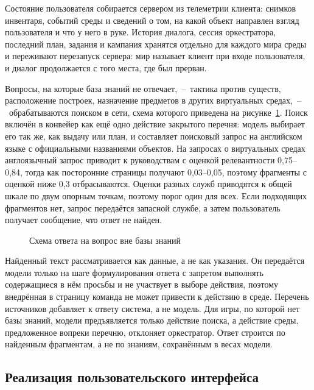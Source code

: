 Состояние пользователя собирается сервером из телеметрии клиента: снимков инвентаря,
событий среды и сведений о том, на какой объект направлен взгляд пользователя и что у
него в руке. История диалога, сессия оркестратора, последний план, задания и кампания
хранятся отдельно для каждого мира среды и переживают перезапуск сервера: мир называет
клиент при входе пользователя, и диалог продолжается с того места, где был прерван.

Вопросы, на которые база знаний не отвечает,~--~тактика против существ, расположение
построек, назначение предметов в других виртуальных средах,~--~обрабатываются поиском в
сети, схема которого приведена на рисунке~\ref{fig:websearch}. Поиск включён в конвейер
как ещё одно действие закрытого перечня: модель выбирает его так же, как выдачу или план,
и составляет поисковый запрос на английском языке с официальными названиями объектов.
На запросах о виртуальных средах англоязычный запрос приводит к руководствам с оценкой
релевантности 0,75--0,84, тогда как посторонние страницы получают 0,03--0,05, поэтому
фрагменты с оценкой ниже 0,3 отбрасываются. Оценки разных служб приводятся к общей шкале
по двум опорным точкам, поэтому порог один для всех. Если подходящих фрагментов нет, запрос
передаётся запасной службе, а затем пользователь получает сообщение, что ответ не найден.

\begin{figure}[!htb]
  \centering
  
  \caption{Схема ответа на вопрос вне базы знаний}
  \label{fig:websearch}
\end{figure}

{ Найденный текст рассматривается как данные, а не как указания. Он передаётся модели
только на шаге формулирования ответа с запретом выполнять содержащиеся в нём просьбы и не
участвует в выборе действия, поэтому внедрённая в страницу команда не может привести к
действию в среде. Перечень источников добавляет к ответу система, а не модель. Для игры,
по которой нет базы знаний, модели предъявляется только действие поиска, а действие среды,
предложенное вопреки перечню, отклоняет оркестратор. Ответ строится по найденным
фрагментам, а не по знаниям, сохранённым в весах модели\cite{Lewis2020,Greshake2023}.\par}

\subsection{Реализация пользовательского интерфейса}

